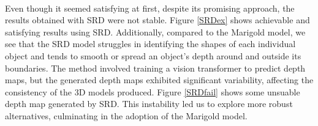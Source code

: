 \documentclass[12pt, letterpaper]{article}
\begin{document}
\begin{spacing}{1.15}
\paragraph{}
Even though it seemed satisfying at first, despite its promising approach, the results obtained with SRD were not stable. Figure \ref{SRDex} shows achievable and satisfying results using SRD.
Additionally, compared to the Marigold model, we see that the SRD model struggles in identifying the shapes of each individual object and tends to smooth or spread an object's depth around and
outside its boundaries.
The method involved training a vision transformer to predict depth maps, but the generated depth maps exhibited significant variability, affecting the consistency of the 3D models produced.
Figure \ref{SRDfail} shows some unsuable depth map generated by SRD. This instability led us to explore more robust alternatives, culminating in the adoption of the Marigold model.


\end{spacing}
\end{document}
